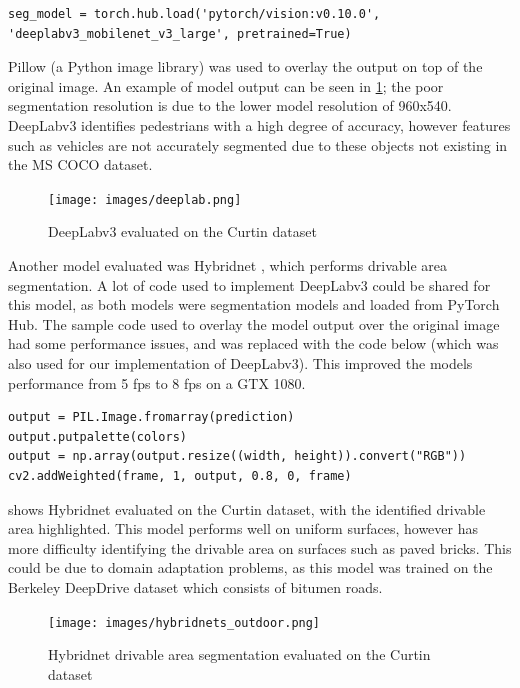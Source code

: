 \documentclass[12pt]{article}
\begin{document}
\begin{verbatim}
seg_model = torch.hub.load('pytorch/vision:v0.10.0', 'deeplabv3_mobilenet_v3_large', pretrained=True)
\end{verbatim}

Pillow (a Python image library) was used to overlay the output on top of the original image.
An example of model output can be seen in \cref{fig:deeplab}; the poor segmentation resolution is due to the
lower model resolution of 960x540. DeepLabv3 identifies pedestrians with a high degree of accuracy, however
features such as vehicles are not accurately segmented due to these objects not existing in the MS COCO dataset.

\begin{figure}[H]
    \centering
    \texttt{[image: images/deeplab.png]}
    \caption{DeepLabv3 evaluated on the Curtin dataset}
    \label{fig:deeplab}
\end{figure}

Another model evaluated was Hybridnet \cite{vuHybridNetsEndtoEndPerception2022}, which performs drivable area segmentation.
A lot of code used to implement DeepLabv3 could be shared for this model, as both models were segmentation models
and loaded from PyTorch Hub. The sample code used to overlay the model output over the original image had some
performance issues, and was replaced with the code below (which was also used for our implementation of DeepLabv3).
This improved the models performance from 5 fps to 8 fps on a GTX 1080.
\begin{verbatim}
output = PIL.Image.fromarray(prediction)
output.putpalette(colors)
output = np.array(output.resize((width, height)).convert("RGB"))
cv2.addWeighted(frame, 1, output, 0.8, 0, frame)
\end{verbatim}

 shows Hybridnet evaluated on the Curtin dataset, with the identified drivable area highlighted.
This model performs well on uniform surfaces, however has more difficulty identifying the drivable area on surfaces such as paved bricks.
This could be due to domain adaptation problems, as this model was trained on the Berkeley DeepDrive dataset \cite{yuBDD100KDiverseDriving2018}
which consists of bitumen roads.

\begin{figure}[H]
    \centering
    \texttt{[image: images/hybridnets\_outdoor.png]}
    \caption{Hybridnet drivable area segmentation evaluated on the Curtin dataset}
    \label{fig:hybridnets_outdoor}
\end{figure}
\end{document}
